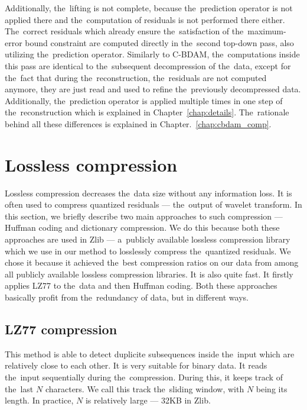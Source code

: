Additionally, the~lifting is not complete, because the~prediction operator is not applied there and the~computation of residuals is not performed there either. The~correct residuals which already ensure the~satisfaction of the~maximum-error bound constraint are computed directly in the~second top-down pass, also utilizing the~prediction operator. Similarly to C-BDAM, the~computations inside this pass are identical to the~subsequent decompression of the~data, except for the~fact that during the~reconstruction, the~residuals are not computed anymore, they are just read and used to refine the~previously decompressed data. Additionally, the~prediction operator is applied multiple times in one step of the~reconstruction which is explained in Chapter~\ref{chap:details}. The~rationale behind all these differences is explained in Chapter.~\ref{chap:cbdam_comp}.

\section{Lossless compression}\label{sec:lossless_comp}

Lossless compression decreases the~data size without any information loss. It is often used to compress quantized residuals --- the~output of wavelet transform. In this section, we briefly describe two main approaches to such compression --- Huffman coding and dictionary compression. We do this because both these approaches are used in Zlib --- a~publicly available lossless compression library which we use in our method to losslessly compress the~quantized residuals. We chose it because it achieved the~best compression ratios on our data from among all publicly available lossless compression libraries. It is also quite fast. It firstly applies LZ77 to the~data and then Huffman coding. Both these approaches basically profit from the~redundancy of data, but in different ways.

\subsection*{LZ77 compression}\label{subsec:lz77}

This method is able to detect duplicite subsequences inside the~input which are relatively close to each other. It is very suitable for binary data. It reads the~input sequentially during the~compression. During this, it keeps track of the~last $N$ characters. We call this track the~sliding window, with $N$ being its length. In practice, $N$ is relatively large --- 32KB in Zlib. 


